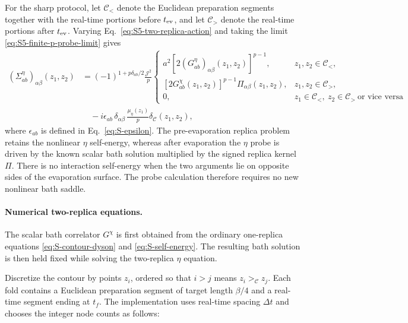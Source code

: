 \documentclass[11pt,a4paper]{article}
\begin{document}
For the sharp protocol, let \(\mathcal C_<\) denote the Euclidean preparation
segments together with the real-time portions before \(t_{\rm ev}\), and let
\(\mathcal C_>\) denote the real-time portions after \(t_{\rm ev}\). Varying
Eq.~\eqref{eq:S5-two-replica-action} and taking the limit
\eqref{eq:S5-finite-p-probe-limit} gives
\begin{equation}
\begin{aligned}
  (\Sigma^\eta_{ab})_{\alpha\beta}(z_1,z_2)
  &=
  (-1)^{1+p\delta_{ab}/2}
  \frac{\mathcal J^2}{p}
  \begin{cases}
    a^2
    \left[
    2(G^\eta_{ab})_{\alpha\beta}(z_1,z_2)
    \right]^{p-1},
    &z_1,z_2\in\mathcal C_<,
    \\[6pt]
    \left[
    2G^\chi_{ab}(z_1,z_2)
    \right]^{p-1}
    \Pi_{\alpha\beta}(z_1,z_2),
    &z_1,z_2\in\mathcal C_>,
    \\[6pt]
    0,
    &z_1\in\mathcal C_<,\ z_2\in\mathcal C_>
    \ \text{or vice versa}
  \end{cases}
  \\
  &\quad
  -
  i\epsilon_{ab}\,
  \delta_{\alpha\beta}\,
  \frac{\mu_\eta(z_1)}{p}
  \delta_{\mathcal C}(z_1,z_2),
\end{aligned}
\label{eq:S5-probe-self-energy}
\end{equation}
where \(\epsilon_{ab}\) is defined in Eq.~\eqref{eq:S-epsilon}. The
pre-evaporation replica problem retains the nonlinear \(\eta\) self-energy,
whereas after evaporation the \(\eta\) probe is driven by the known scalar
bath solution multiplied by the signed replica kernel \(\Pi\). There is no
interaction self-energy when the two arguments lie on opposite sides of the
evaporation surface. The probe calculation therefore requires no new
nonlinear bath saddle.

\paragraph*{Numerical two-replica equations.}

The scalar bath correlator \(G^\chi\) is first obtained from the ordinary
one-replica equations \eqref{eq:S-contour-dyson} and
\eqref{eq:S-self-energy}. The resulting bath solution is then held fixed
while solving the two-replica \(\eta\) equation.

Discretize the contour by points \(z_i\), ordered so that
\(i>j\) means \(z_i>_{\mathcal C}z_j\). Each fold contains a Euclidean
preparation segment of target length \(\beta/4\) and a real-time segment
ending at \(t_f\). The implementation uses real-time spacing \(\Delta t\)
and chooses the integer node counts as follows:
\end{document}
